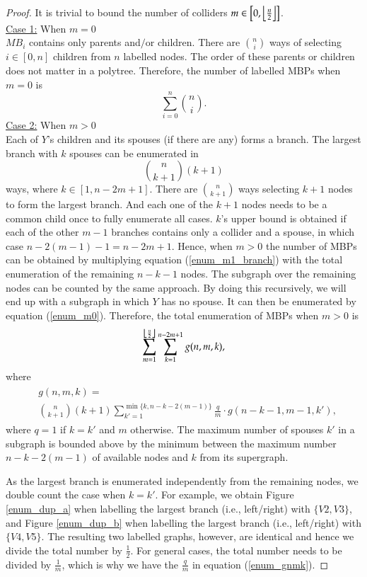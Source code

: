 \begin{proof}
It is trivial to bound the number of colliders $m \in \left[0, \floor*{\frac{n}{2}}\right]$. \\
\underline{Case 1:} When $m=0$\\
$MB_i$ contains only parents and$/$or children. There are ${n \choose i}$ ways of selecting $i \in [0, n]$ children from $n$ labelled nodes. The order of these parents or children does not matter in a polytree. Therefore, the number of labelled MBPs when $m=0$ is 
\begin{equation}
\label{enum_m0} 
\sum_{i=0}^n {n \choose i}.
\end{equation}
\underline{Case 2:} When $m > 0$\\
Each of $Y$'s children and its spouses (if there are any) forms a branch. The largest branch with $k$ spouses can be enumerated in 
\begin{equation}
\label{enum_m1_branch}
{n \choose k+1}(k+1)
\end{equation}  
ways, where $k \in [1, n-2m+1]$. There are ${n \choose k + 1}$ ways selecting $k+1$ nodes to form the largest branch. And each one of the $k+1$ nodes needs to be a common child once to fully enumerate all cases. $k$'s upper bound is obtained if each of the other $m-1$ branches contains only a collider and a spouse, in which case $n - 2(m-1) -1 = n-2m+1$. Hence, when $m > 0$ the number of MBPs can be obtained by multiplying equation (\ref{enum_m1_branch}) with the total enumeration of the remaining $n-k-1$ nodes. The subgraph over the remaining nodes can be counted by the same approach. By doing this recursively, we will end up with a subgraph in which $Y$ has no spouse. It can then be enumerated by equation (\ref{enum_m0}). Therefore, the total enumeration of MBPs when $m > 0$ is 
\begin{equation}
\label{enum_m1}
\sum_{m=1}^{\floor*{\frac{n}{2}}} \sum_{k=1}^{n-2m+1} g(n,m,k), 
\end{equation}
where
\begin{align}
\label{enum_gnmk}
\begin{split}
&g(n,m,k) = \\ 
&{n \choose k+1}(k+1) \sum_{k'=1}^{\min\{k, n-k-2(m-1)\}}\frac{q}{m} \cdot g(n-k-1,m-1,k'),
\end{split}
\end{align}
where $q=1$ if $k=k'$ and $m$ otherwise. The maximum number of spouses $k'$ in a subgraph is bounded above by the minimum between the maximum number $n-k-2(m-1)$ of available nodes and $k$ from its supergraph. 

As the largest branch is enumerated independently from the remaining nodes, we double count the case when $k=k'$. For example, we obtain Figure \ref{enum_dup_a} when labelling the largest branch (i.e., left/right) with $\{V2, V3\}$, and Figure \ref{enum_dup_b} when labelling the largest branch (i.e., left/right) with $\{V4, V5\}$. The resulting two labelled graphs, however, are identical and hence we divide the total number by $\frac{1}{2}$. For general cases, the total number needs to be divided by $\frac{1}{m}$, which is why we have the $\frac{q}{m}$ in equation (\ref{enum_gnmk}).
\qedwhite
\end{proof}


